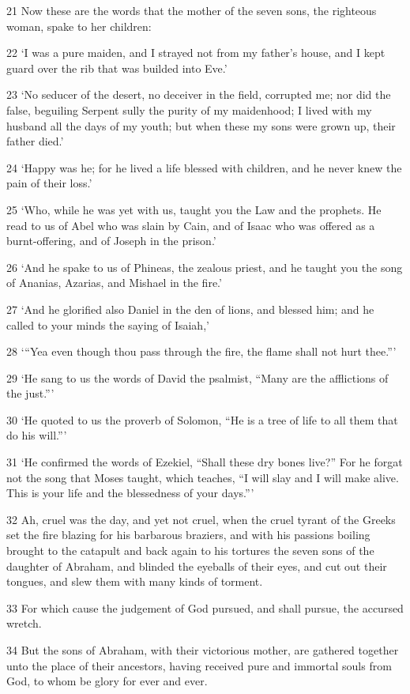 \par 21 Now these are the words that the mother of the seven sons, the righteous woman, spake to her children:

\par 22 ‘I was a pure maiden, and I strayed not from my father's house, and I kept guard over the rib that was builded into Eve.’

\par 23 ‘No seducer of the desert, no deceiver in the field, corrupted me; nor did the false, beguiling Serpent sully the purity of my maidenhood; I lived with my husband all the days of my youth; but when these my sons were grown up, their father died.’

\par 24 ‘Happy was he; for he lived a life blessed with children, and he never knew the pain of their loss.’

\par 25 ‘Who, while he was yet with us, taught you the Law and the prophets. He read to us of Abel who was slain by Cain, and of Isaac who was offered as a burnt-offering, and of Joseph in the prison.’

\par 26 ‘And he spake to us of Phineas, the zealous priest, and he taught you the song of Ananias, Azarias, and Mishael in the fire.’

\par 27 ‘And he glorified also Daniel in the den of lions, and blessed him; and he called to your minds the saying of Isaiah,’

\par 28 ‘“Yea even though thou pass through the fire, the flame shall not hurt thee.”’

\par 29 ‘He sang to us the words of David the psalmist, “Many are the afflictions of the just.”’

\par 30 ‘He quoted to us the proverb of Solomon, “He is a tree of life to all them that do his will.”’

\par 31 ‘He confirmed the words of Ezekiel, “Shall these dry bones live?” For he forgat not the song that Moses taught, which teaches, “I will slay and I will make alive. This is your life and the blessedness of your days.”’

\par 32 Ah, cruel was the day, and yet not cruel, when the cruel tyrant of the Greeks set the fire blazing for his barbarous braziers, and with his passions boiling brought to the catapult and back again to his tortures the seven sons of the daughter of Abraham, and blinded the eyeballs of their eyes, and cut out their tongues, and slew them with many kinds of torment.

\par 33 For which cause the judgement of God pursued, and shall pursue, the accursed wretch.

\par 34 But the sons of Abraham, with their victorious mother, are gathered together unto the place of their ancestors, having received pure and immortal souls from God, to whom be glory for ever and ever.


